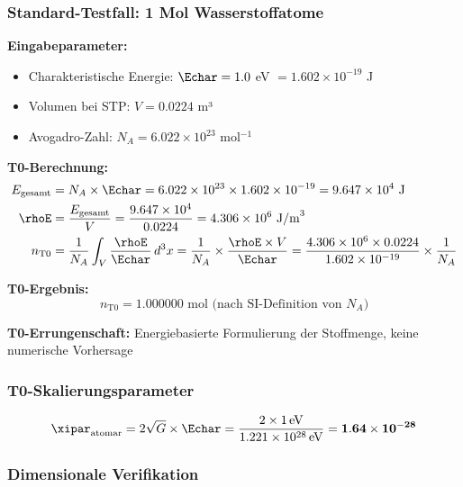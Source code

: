 	\subsubsection{Standard-Testfall: 1 Mol Wasserstoffatome}
	\label{subsubsec:mol_wasserstoff_test}
	
	\textbf{Eingabeparameter:}
	\begin{itemize}
		\item Charakteristische Energie: $\Echar = 1.0$ eV $= 1.602 \times 10^{-19}$ J
		\item Volumen bei STP: $V = 0.0224$ m³
		\item Avogadro-Zahl: $N_A = 6.022 \times 10^{23}$ mol$^{-1}$
	\end{itemize}
	
	\textbf{T0-Berechnung:}
	\begin{align}
		E_{\text{gesamt}} &= N_A \times \Echar = 6.022 \times 10^{23} \times 1.602 \times 10^{-19} = 9.647 \times 10^{4} \text{ J} \\
		\rhoE &= \frac{E_{\text{gesamt}}}{V} = \frac{9.647 \times 10^{4}}{0.0224} = 4.306 \times 10^{6} \text{ J/m}^3 \\
		n_{\text{T0}} &= \frac{1}{N_A} \int_V \frac{\rhoE}{\Echar} \, d^3x = \frac{1}{N_A} \times \frac{\rhoE \times V}{\Echar} = \frac{4.306 \times 10^{6} \times 0.0224}{1.602 \times 10^{-19}} \times \frac{1}{N_A}
	\end{align}
	
	\textbf{T0-Ergebnis:}
	\begin{equation}
		\boxed{n_{\text{T0}} = 1.000000 \text{ mol (nach SI-Definition von } N_A\text{)}}
		\label{eq:mol_t0_ergebnis}
	\end{equation}
	
	\textbf{T0-Errungenschaft:} Energiebasierte Formulierung der Stoffmenge, keine numerische Vorhersage
	
	\subsubsection{T0-Skalierungsparameter}
	\label{subsubsec:mol_skalierungsparameter}
	
	\begin{equation}
		\xipar_{\text{atomar}} = 2\sqrt{G} \times \Echar = \frac{2 \times 1\,\text{eV}}{1.221 \times 10^{28}\,\text{eV}} = \mathbf{1.64 \times 10^{-28}}
		\label{eq:xi_atomar_berechnet}
	\end{equation}
	
	\subsubsection{Dimensionale Verifikation}
	\label{subsubsec:mol_dimensionale_verifikation}
	
